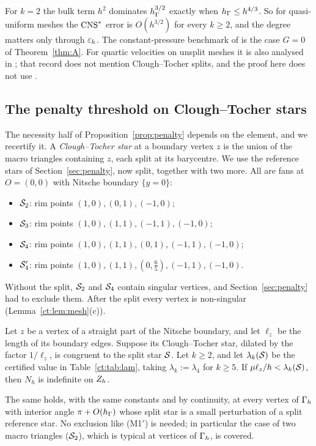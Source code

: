 \begin{remark}
For $k=2$ the bulk term $h^2$ dominates $h_\Gamma^{3/2}$ exactly when $h_\Gamma\le h^{4/3}$. So for quasi-uniform meshes the $\mathrm{CNS}^\ast$ error is $O(h^{3/2})$ for every $k\ge2$, and the degree matters only through $\varepsilon_h$. The constant-pressure benchmark of \cite{GjerdeScott2024} is the case $G=0$ of Theorem~\ref{thm:A}. For quartic velocities on unsplit meshes it is also analysed in \cite{Cavalcante}; that record does not mention Clough--Tocher splits, and the proof here does not use \cite{Cavalcante}.
\end{remark}

\subsection{The penalty threshold on Clough--Tocher stars}

The necessity half of Proposition~\ref{prop:penalty} depends on the element, and we recertify it. A \emph{Clough--Tocher star} at a boundary vertex $z$ is the union of the macro triangles containing $z$, each split at its barycentre. We use the reference stars of Section~\ref{sec:penalty}, now split, together with two more. All are fans at $O=(0,0)$ with Nitsche boundary $\{y=0\}$:
\begin{itemize}
\item $\mathcal S_2$: rim points $(1,0),(0,1),(-1,0)$;
\item $\mathcal S_3$: rim points $(1,0),(1,1),(-1,1),(-1,0)$;
\item $\mathcal S_4$: rim points $(1,0),(1,1),(0,1),(-1,1),(-1,0)$;
\item $\mathcal S_4'$: rim points $(1,0),(1,1),(0,\tfrac65),(-1,1),(-1,0)$.
\end{itemize}
Without the split, $\mathcal S_2$ and $\mathcal S_4$ contain singular vertices, and Section~\ref{sec:penalty} had to exclude them. After the split every vertex is non-singular (Lemma~\ref{ct:lem:mesh}(c)).

\begin{proposition}\label{ct:prop:penalty}
Let $z$ be a vertex of a straight part of the Nitsche boundary, and let $\ell_z$ be the length of its boundary edges. Suppose its Clough--Tocher star, dilated by the factor $1/\ell_z$, is congruent to the split star $\mathcal S$. Let $k\ge2$, and let $\lambda_k(\mathcal S)$ be the certified value in Table~\ref{ct:tab:lam}, taking $\lambda_k:=\lambda_4$ for $k\ge5$. If $\mu\ell_z/h<\lambda_k(\mathcal S)$, then $N_h$ is indefinite on $Z_h$.

The same holds, with the same constants and by continuity, at every vertex of $\Gamma_h$ with interior angle $\pi+O(h_\Gamma)$ whose split star is a small perturbation of a split reference star. No exclusion like (M1$'$) is needed; in particular the case of two macro triangles ($\mathcal S_2$), which is typical at vertices of $\Gamma_h$, is covered.
\end{proposition}

